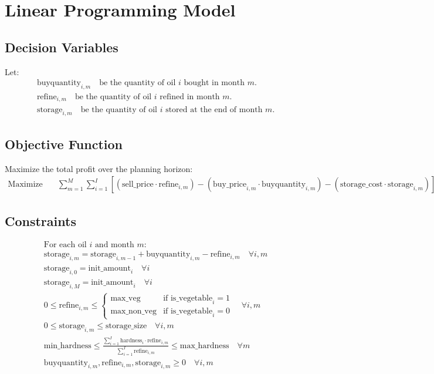 \documentclass{article}
\begin{document}
\section*{Linear Programming Model}

\subsection*{Decision Variables}
Let:
\begin{align*}
  & \text{buyquantity}_{i, m} \quad \text{be the quantity of oil $i$ bought in month $m$.} \\
  & \text{refine}_{i, m} \quad \text{be the quantity of oil $i$ refined in month $m$.} \\
  & \text{storage}_{i, m} \quad \text{be the quantity of oil $i$ stored at the end of month $m$.}
\end{align*}

\subsection*{Objective Function}
Maximize the total profit over the planning horizon:
\begin{align*}
  \text{Maximize} \quad 
  & \sum_{m=1}^{M} \sum_{i=1}^{I} \left[ (\text{sell\_price} \cdot \text{refine}_{i, m}) - (\text{buy\_price}_{i, m} \cdot \text{buyquantity}_{i, m}) - (\text{storage\_cost} \cdot \text{storage}_{i, m}) \right]
\end{align*}

\subsection*{Constraints}
\begin{align*}
  & \text{For each oil } i \text{ and month } m: \\
  & \text{storage}_{i, m} = \text{storage}_{i, m-1} + \text{buyquantity}_{i, m} - \text{refine}_{i, m} \quad \forall i, m \\
  & \text{storage}_{i, 0} = \text{init\_amount}_{i} \quad \forall i \\
  & \text{storage}_{i, M} = \text{init\_amount}_{i} \quad \forall i \\
  & 0 \leq \text{refine}_{i, m} \leq \begin{cases} 
      \text{max\_veg} & \text{if } \text{is\_vegetable}_{i} = 1 \\
      \text{max\_non\_veg} & \text{if } \text{is\_vegetable}_{i} = 0 
    \end{cases} \quad \forall i, m \\
  & 0 \leq \text{storage}_{i, m} \leq \text{storage\_size} \quad \forall i, m \\
  & \text{min\_hardness} \leq \frac{\sum_{i=1}^{I} \text{hardness}_{i} \cdot \text{refine}_{i, m}}{\sum_{i=1}^{I} \text{refine}_{i, m}} \leq \text{max\_hardness} \quad \forall m \\
  & \text{buyquantity}_{i, m}, \text{refine}_{i, m}, \text{storage}_{i, m} \geq 0 \quad \forall i, m
\end{align*}
\end{document}
